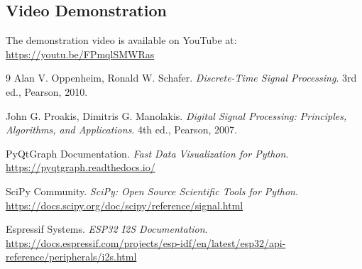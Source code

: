 \documentclass[11pt,a4paper]{article}
\begin{document}
\subsection{Video Demonstration}
The demonstration video is available on YouTube at:
\url{https://youtu.be/FPmqlSMWRas}

\begin{thebibliography}{9}
Alan V. Oppenheim, Ronald W. Schafer. 
\textit{Discrete-Time Signal Processing}. 
3rd ed., Pearson, 2010.

John G. Proakis, Dimitris G. Manolakis. 
\textit{Digital Signal Processing: Principles, Algorithms, and Applications}. 
4th ed., Pearson, 2007.

PyQtGraph Documentation. \textit{Fast Data Visualization for Python}.
\url{https://pyqtgraph.readthedocs.io/}

SciPy Community. \textit{SciPy: Open Source Scientific Tools for Python}.
\url{https://docs.scipy.org/doc/scipy/reference/signal.html}

Espressif Systems. \textit{ESP32 I2S Documentation}.
\url{https://docs.espressif.com/projects/esp-idf/en/latest/esp32/api-reference/peripherals/i2s.html}

\end{thebibliography}
\end{document}
